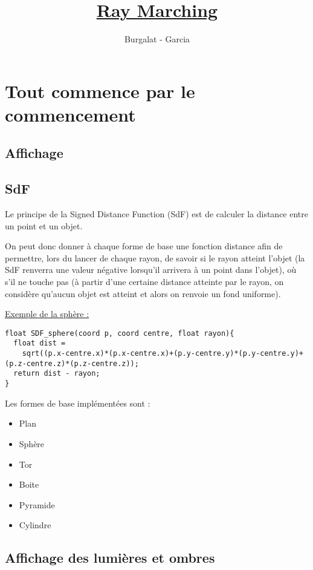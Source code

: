 \documentclass{article}
\title{\underline{Ray Marching}}
\date{}
\author{Burgalat - Garcia}
\begin{document}
\maketitle
\tableofcontents
\clearpage

\section{Tout commence par le commencement}
\subsection{Affichage}

\subsection{SdF}
Le principe de la Signed Distance Function (SdF) est de calculer la distance entre un point et un objet.
\smallskip

On peut donc donner à chaque forme de base une fonction distance afin de permettre, lors du lancer de chaque rayon, 
de savoir si le rayon atteint l'objet (la SdF renverra une valeur négative lorsqu'il arrivera à un point dans l'objet),
où s'il ne touche pas (à partir d'une certaine distance atteinte par le rayon, on considère qu'aucun objet est atteint et alors on renvoie un fond uniforme).
\medskip 

\underline{Exemple de la sphère :}
\begin{lstlisting}
float SDF_sphere(coord p, coord centre, float rayon){
  float dist = 
    sqrt((p.x-centre.x)*(p.x-centre.x)+(p.y-centre.y)*(p.y-centre.y)+(p.z-centre.z)*(p.z-centre.z));
  return dist - rayon;
}
\end{lstlisting}
\medskip 

Les formes de base implémentées sont : 
\begin{itemize}
    \item Plan
    \item Sphère
    \item Tor
    \item Boite
    \item Pyramide 
    \item Cylindre
\end{itemize}

\subsection{Affichage des lumières et ombres}
\end{document}
